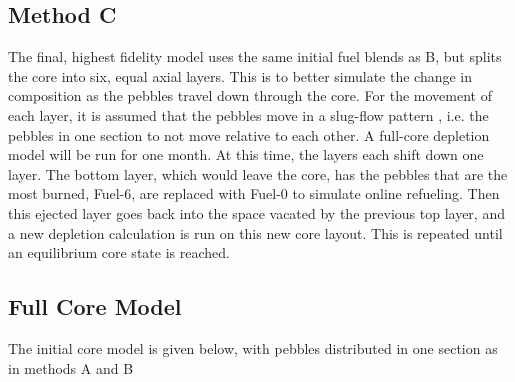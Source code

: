 \documentclass{anstrans}
\begin{document}
\subsection{Method C}
The final, highest fidelity model uses the same initial fuel blends as B, but splits the core into six, equal axial layers.  This is to better simulate the change in composition as the pebbles travel down through the core.
For the movement of each layer, it is assumed that the pebbles move in a slug-flow pattern \cite{cisneros_pebble_2013}, i.e. the pebbles in one section to not move relative to each other.  A full-core depletion model will be run for one month.  At this time, the layers each shift down one layer.  The bottom layer, which would leave the core, has the pebbles that are the most burned, Fuel-6, are replaced with Fuel-0 to simulate online refueling.  Then this ejected layer goes back into the space vacated by the previous top layer, and a new depletion calculation is run on this new core layout.  This is repeated until an equilibrium core state is reached.


\subsection{Full Core Model}

The initial core model is given below, with pebbles distributed in one section as in methods A and B
\end{document}
